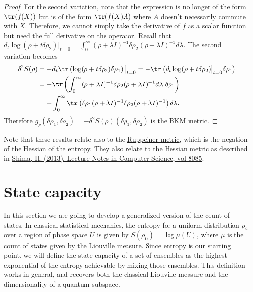 \begin{mathSection}
\begin{proof}
	For the second variation, note that the expression is no longer of the form $\tr(f(X))$ but is of the form $\tr(f(X)A)$ where $A$ doesn't necessarily commute with $X$. Therefore, we cannot simply take the derivative of $f$ as a scalar function but need the full derivative on the operator. Recall that $d_t \log(\rho + t \delta\rho_2)\big|_{t=0} = \int_0^\infty (\rho + \lambda I)^{-1} \delta \rho_2 (\rho + \lambda I)^{-1} d\lambda$. The second variation becomes
	\begin{equation}
		\begin{aligned}
			\delta^2 S(\rho) &= - d_t \tr\left(\log(\rho + t \delta\rho_2) \delta \rho_1 \right) \big|_{t=0} =  -  \tr\left(d_t \log(\rho + t \delta\rho_2)\big|_{t=0} \delta \rho_1 \right)   \\
			&= - \tr\left(\int_0^\infty (\rho + \lambda I)^{-1} \delta \rho_2 (\rho + \lambda I)^{-1} d\lambda \; \delta \rho_1 \right) \\
			&= - \int_0^\infty \tr\left(\delta \rho_1  (\rho + \lambda I)^{-1} \delta \rho_2 (\rho + \lambda I)^{-1} \right) d\lambda.
		\end{aligned}
	\end{equation}
	Therefore $g_\rho(\delta\rho_1,\delta\rho_2)=-\delta^2S(\rho)(\delta\rho_1,\delta\rho_2)$ is the BKM metric.
\end{proof}

\begin{remark}
	Note that these results relate also to the \href{https://en.wikipedia.org/wiki/Ruppeiner_geometry}{Ruppeiner metric}, which is the negation of the Hessian of the entropy. They also relate to the Hessian metric as described in \href{https://link.springer.com/chapter/10.1007/978-3-642-40020-9_4}{Shima, H. (2013). Lecture Notes in Computer Science, vol 8085}.
\end{remark}
\end{mathSection}

\section{State capacity}

In this section we are going to develop a generalized version of the count of states. In classical statistical mechanics, the entropy for a uniform distribution $\rho_U$ over a region of phase space $U$ is given by $S(\rho_U) = \log \mu(U)$, where $\mu$ is the count of states given by the Liouville measure. Since entropy is our starting point, we will define the state capacity of a set of ensembles as the highest exponential of the entropy achievable by mixing those ensembles. This definition works in general, and recovers both the classical Liouville measure and the dimensionality of a quantum subspace.


